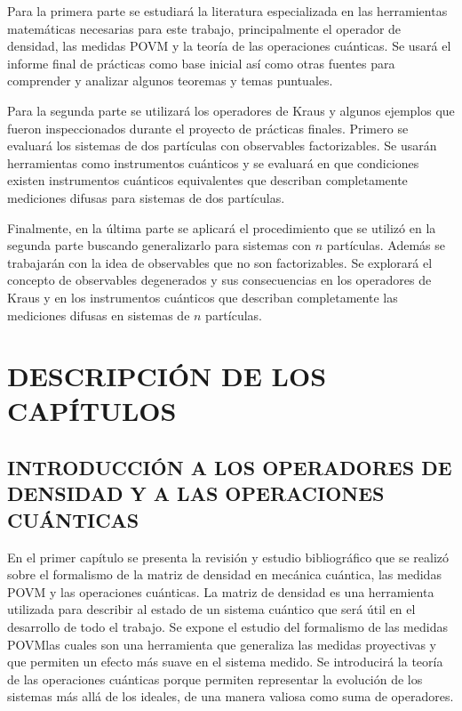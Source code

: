 \documentclass[12pt,oneside]{book}\raggedbottom{} %
\begin{document}
{{{Para la primera parte se estudiará la literatura especializada en las herramientas matemáticas necesarias para este trabajo, principalmente el operador de densidad, las medidas POVM y la teoría de las operaciones cuánticas. Se usará el informe final de prácticas como base inicial así como  otras fuentes para comprender y analizar algunos teoremas y temas puntuales.




Para la segunda parte se utilizará los operadores de Kraus y algunos ejemplos que fueron inspeccionados durante el proyecto de prácticas finales. Primero se evaluará los sistemas de dos partículas con observables factorizables. Se usarán herramientas como instrumentos cuánticos y se evaluará en que condiciones existen instrumentos cuánticos equivalentes que describan completamente mediciones difusas para sistemas de dos partículas.

 Finalmente, en la última parte se aplicará el procedimiento   que se utilizó en la segunda parte buscando generalizarlo para sistemas con $n$ partículas. Además se trabajarán con la idea de observables que no son factorizables. Se explorará el concepto de observables degenerados y sus consecuencias en los operadores de Kraus y en los instrumentos cuánticos que describan completamente las mediciones difusas en sistemas de $n$ partículas.

\chapter{DESCRIPCIÓN DE LOS CAPÍTULOS}  %
\section{INTRODUCCIÓN A LOS OPERADORES DE DENSIDAD Y A LAS OPERACIONES CUÁNTICAS}
En el primer capítulo  se presenta la revisión y estudio bibliográfico que se
realizó sobre el formalismo de la matriz de densidad en mecánica cuántica, las
medidas POVM y las operaciones cuánticas. La matriz de densidad es una
herramienta utilizada para describir al estado de un sistema cuántico que será
útil en el desarrollo de todo el trabajo.  Se expone el estudio del formalismo
de las medidas POVM\@ las cuales son una herramienta que generaliza las medidas
proyectivas y que permiten un efecto más suave en el sistema medido.  Se
introducirá la teoría de las operaciones cuánticas  porque permiten representar
la evolución de los sistemas más allá de los ideales, de una manera valiosa
como suma de operadores.

}}}
\end{document}
